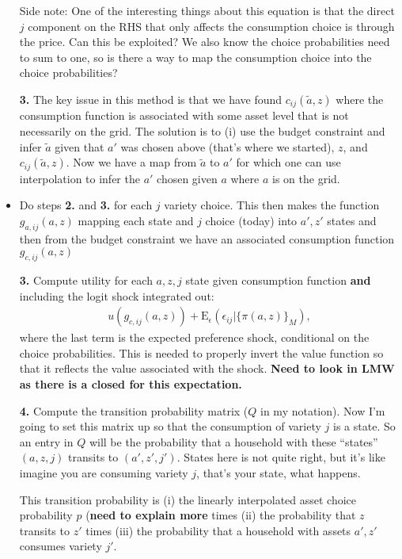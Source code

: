 \documentclass[12pt,pdftex]{article}
\begin{document}
\begin{onehalfspacing}
\begin{itemize}
Side note: One of the interesting things about this equation is that the direct $j$ component on the RHS that only affects the consumption choice is through the price. Can this be exploited? We also know the choice probabilities need to sum to one, so is there a way to map the consumption choice into the choice probabilities?

\item[\textbf{3.}] The key issue in this method is that we have found  $c_{ij}(\tilde a, z)$ where the consumption function is associated with some asset level that is not necessarily on the grid. The solution is to (i) use the budget constraint and infer $\tilde a$ given that $a'$ was chosen above (that's where we started), $z$, and $c_{ij}(\tilde a, z)$. Now we have a map from $\tilde a$ to $a'$ for which one can use interpolation to infer the $a'$ chosen given $a$ where $a$ is on the grid.

\item Do steps \textbf{2.} and \textbf{3.} for each $j$ variety choice. This then makes the function $g_{a,ij}(a,z)$ mapping each state and $j$ choice (today) into $a', z'$ states and then from the budget constraint we have an associated consumption function $g_{c,ij}(a,z)$

\item[\textbf{3.}] Compute utility for each $a,z,j$ state given consumption function \textbf{and} including the logit shock integrated out:
\begin{align}
u(g_{c,ij}(a,z)) + \mathrm{E}_{\epsilon}(\epsilon_{ij} | \{\pi(a, z)\}_M ), \label{eq:utility_azj}
\end{align}
where the last term is the expected preference shock, conditional on the choice probabilities. This is needed to properly invert the value function so that it reflects the value associated with the shock. \textbf{Need to look in LMW as there is a closed for this expectation.}

\item[\textbf{4.}] Compute the transition probability matrix ($Q$ in my notation). Now I'm going to set this matrix up so that the consumption of variety $j$ is a state. So an entry in $Q$ will be the probability that a household with these ``states'' $(a,z,j)$ transits to $(a',z',j')$. States here is not quite right, but it's like imagine you are consuming variety $j$, that's your state, what happens.
    
    This transition probability is (i) the linearly interpolated asset choice probability $p$ (\textbf{need to explain more} times (ii) the probability that $z$ transits to $z'$ times (iii) the probability that a household with assets $a',z'$ consumes variety $j'$.


\end{itemize}
\end{onehalfspacing}
\end{document}
